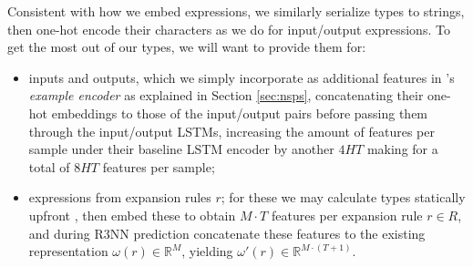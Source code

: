 \documentclass{article}
\begin{document}
Consistent with how we embed expressions, we similarly serialize types to strings,
then one-hot encode their characters as we do for input/output expressions.
To get the most out of our types, we will want to provide them for:
\begin{itemize}
    \item inputs and outputs,
    which we simply incorporate as additional features in \citet{nsps}'s
    \emph{example encoder} as explained in Section \ref{sec:nsps},
    concatenating their one-hot embeddings to those of the input/output pairs before passing them through the input/output LSTMs,
    increasing the amount of features per sample under their baseline
    LSTM encoder by another $4HT$ making for a total of $8HT$ features per sample;

    \item expressions from expansion rules $r$; %
    for these we may calculate types statically upfront%
,
    then embed these to obtain $M \cdot T$ features per expansion rule $r \in R$,
    and during R3NN prediction concatenate these features to the existing
    representation $\omega(r) \in \mathbb{R}^M$,
    yielding $\omega'(r) \in \mathbb{R}^{M \cdot (T+1)}$.


\end{itemize}
\end{document}
